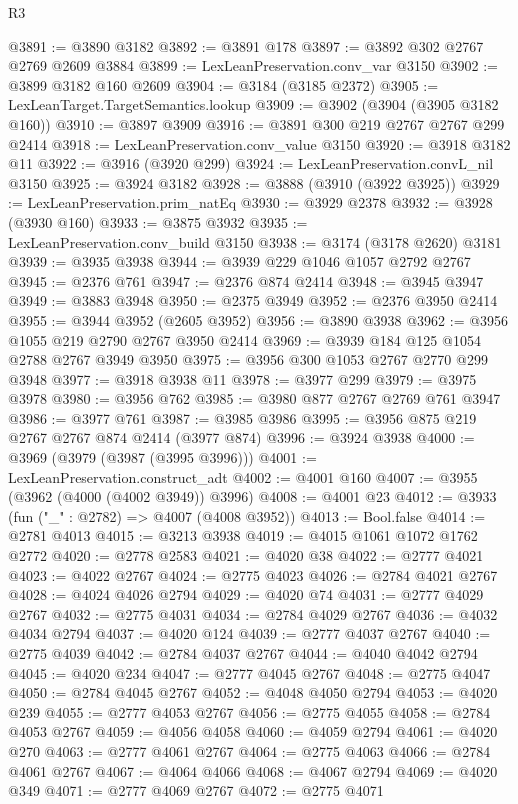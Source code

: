 \begin{lexlean}{R3}
\begin{coremodule}
@3891 := @3890 @3182
@3892 := @3891 @178
@3897 := @3892 @302 @2767 @2769 @2609 @3884
@3899 := LexLeanPreservation.conv_var @3150
@3902 := @3899 @3182 @160 @2609
@3904 := @3184 (@3185 @2372)
@3905 := LexLeanTarget.TargetSemantics.lookup
@3909 := @3902 (@3904 (@3905 @3182 @160))
@3910 := @3897 @3909
@3916 := @3891 @300 @219 @2767 @2767 @299 @2414
@3918 := LexLeanPreservation.conv_value @3150
@3920 := @3918 @3182 @11
@3922 := @3916 (@3920 @299)
@3924 := LexLeanPreservation.convL_nil @3150
@3925 := @3924 @3182
@3928 := @3888 (@3910 (@3922 @3925))
@3929 := LexLeanPreservation.prim_natEq
@3930 := @3929 @2378
@3932 := @3928 (@3930 @160)
@3933 := @3875 @3932
@3935 := LexLeanPreservation.conv_build @3150
@3938 := @3174 (@3178 @2620) @3181
@3939 := @3935 @3938
@3944 := @3939 @229 @1046 @1057 @2792 @2767
@3945 := @2376 @761
@3947 := @2376 @874 @2414
@3948 := @3945 @3947
@3949 := @3883 @3948
@3950 := @2375 @3949
@3952 := @2376 @3950 @2414
@3955 := @3944 @3952 (@2605 @3952)
@3956 := @3890 @3938
@3962 := @3956 @1055 @219 @2790 @2767 @3950 @2414
@3969 := @3939 @184 @125 @1054 @2788 @2767 @3949 @3950
@3975 := @3956 @300 @1053 @2767 @2770 @299 @3948
@3977 := @3918 @3938 @11
@3978 := @3977 @299
@3979 := @3975 @3978
@3980 := @3956 @762
@3985 := @3980 @877 @2767 @2769 @761 @3947
@3986 := @3977 @761
@3987 := @3985 @3986
@3995 := @3956 @875 @219 @2767 @2767 @874 @2414 (@3977 @874)
@3996 := @3924 @3938
@4000 := @3969 (@3979 (@3987 (@3995 @3996)))
@4001 := LexLeanPreservation.construct_adt
@4002 := @4001 @160
@4007 := @3955 (@3962 (@4000 (@4002 @3949)) @3996)
@4008 := @4001 @23
@4012 := @3933 (fun ("_" : @2782) => @4007 (@4008 @3952))
@4013 := Bool.false
@4014 := @2781 @4013
@4015 := @3213 @3938
@4019 := @4015 @1061 @1072 @1762 @2772
@4020 := @2778 @2583
@4021 := @4020 @38
@4022 := @2777 @4021
@4023 := @4022 @2767
@4024 := @2775 @4023
@4026 := @2784 @4021 @2767
@4028 := @4024 @4026 @2794
@4029 := @4020 @74
@4031 := @2777 @4029 @2767
@4032 := @2775 @4031
@4034 := @2784 @4029 @2767
@4036 := @4032 @4034 @2794
@4037 := @4020 @124
@4039 := @2777 @4037 @2767
@4040 := @2775 @4039
@4042 := @2784 @4037 @2767
@4044 := @4040 @4042 @2794
@4045 := @4020 @234
@4047 := @2777 @4045 @2767
@4048 := @2775 @4047
@4050 := @2784 @4045 @2767
@4052 := @4048 @4050 @2794
@4053 := @4020 @239
@4055 := @2777 @4053 @2767
@4056 := @2775 @4055
@4058 := @2784 @4053 @2767
@4059 := @4056 @4058
@4060 := @4059 @2794
@4061 := @4020 @270
@4063 := @2777 @4061 @2767
@4064 := @2775 @4063
@4066 := @2784 @4061 @2767
@4067 := @4064 @4066
@4068 := @4067 @2794
@4069 := @4020 @349
@4071 := @2777 @4069 @2767
@4072 := @2775 @4071

\end{coremodule}
\end{lexlean}
